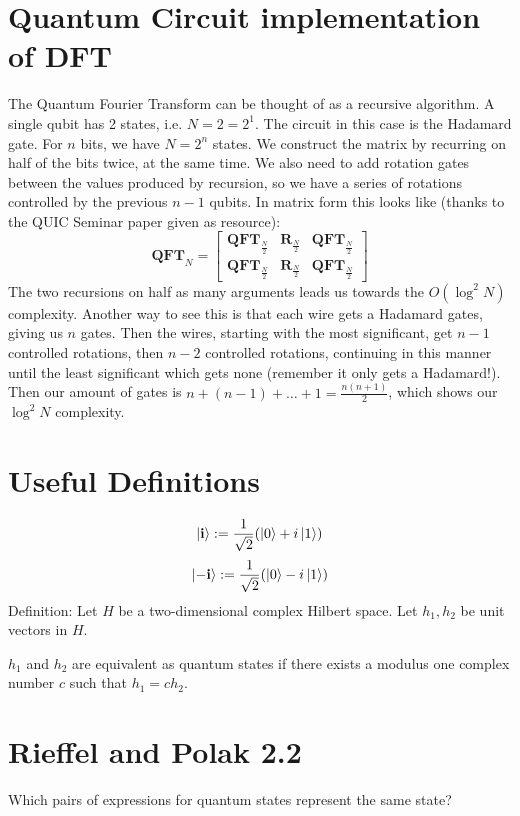 \documentclass[11pt]{article}
\begin{document}
\section{Quantum Circuit implementation of DFT}
The Quantum Fourier Transform can be thought of as a recursive algorithm. 
A single qubit has 2 states, i.e. $N = 2 = 2^1$. The circuit in this case is the 
Hadamard gate. For $n$ bits, we have $N = 2^n$ states. We construct the matrix by
recurring on half of the bits twice, at the same time. We also need to 
add rotation gates between the values produced by recursion, so we have a series
of rotations controlled by the previous $n-1$ qubits.
In matrix form this looks like (thanks to the QUIC Seminar paper given as resource):
$$\textbf{QFT}_N = \begin{bmatrix}\textbf{QFT}_{\frac{N}{2}} & \textbf{R}_{\frac{N}{2}} & \textbf{QFT}_{\frac{N}{2}} \\
	\textbf{QFT}_{\frac{N}{2}} & \textbf{R}_{\frac{N}{2}} & 
	\textbf{QFT}_{\frac{N}{2}} \end{bmatrix}$$
The two recursions on half as many arguments leads us towards the $O(\log^2 N)$ complexity. Another way to see this is that each wire gets a Hadamard gates, giving us $n$ gates.
Then the wires, starting with the most significant, get $n-1$ controlled rotations, 
then $n-2$ controlled rotations, continuing in this manner until the least significant 
which gets none (remember it only gets a Hadamard!).
Then our amount of gates is $n + (n-1) + \dots + 1 = \frac{n(n+1)}{2}$, which shows 
our $\log^2 N$ complexity.
\newpage
\section{Useful Definitions}
$$\ket{\textbf{i}} := \frac{1}{\sqrt{2}}(\ket{0} + i \ket{1})$$
$$\ket{-\textbf{i}} := \frac{1}{\sqrt{2}}(\ket{0} - i \ket{1})$$
Definition: Let $H$ be a two-dimensional complex Hilbert space. Let $h_1, h_2$ be unit vectors in 
$H$. 

$h_1$ and $h_2$ are equivalent as quantum states if there exists a modulus one complex number $c$ 
such that $h_1  = ch_2$.


\section{Rieffel and Polak 2.2}
Which pairs of expressions for quantum states represent the same state?
\end{document}

